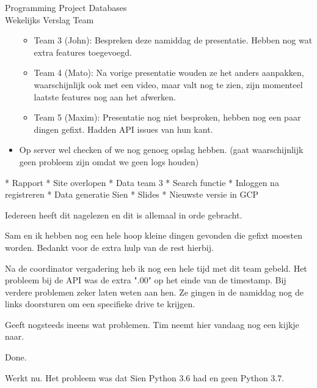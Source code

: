 \documentclass{article}
\newcounter{team}
\begin{document}
\begin{Minutes}{Programming Project Databases \\ Wekelijks Verslag Team }
\begin{itemize}
\begin{itemize}
                \item Team 3 (John): Bespreken deze namiddag de presentatie. Hebben nog wat extra features toegevoegd.
                \item Team 4 (Mato): Na vorige presentatie wouden ze het anders aanpakken, waarschijnlijk ook met een video, maar valt nog te zien, zijn momenteel laatste features nog aan het afwerken.
                \item Team 5 (Maxim): Presentatie nog niet besproken, hebben nog een paar dingen gefixt. Hadden API issues van hun kant.
            \end{itemize}
            \item Op server wel checken of we nog genoeg opslag hebben. (gaat waarschijnlijk geen probleem zijn omdat we geen logs houden)
        \end{itemize}


            \task[]* Rapport
            \task[]* Site overlopen
            \task[]* Data team 3
            \task[]* Search functie
            \task[]* Inloggen na registreren
            \task[]* Data generatie Sien
            \task[]* Slides
            \task[]* Nieuwste versie in GCP



            Iedereen heeft dit nagelezen en dit is allemaal in orde gebracht.

            Sam en ik hebben nog een hele hoop kleine dingen gevonden die gefixt moesten worden. Bedankt voor de extra hulp van de rest hierbij.

            Na de coordinator vergadering heb ik nog een hele tijd met dit team gebeld. Het probleem bij de API was de extra ".00" op het einde van  de timestamp. Bij verdere problemen zeker laten weten aan hen. Ze gingen in de namiddag nog de links doorsturen om een specifieke drive te krijgen.

            Geeft nogsteeds ineens wat problemen. Tim neemt hier vandaag nog een kijkje naar.

            Done.

            Werkt nu. Het probleem was dat Sien Python 3.6 had en geen Python 3.7.


\end{Minutes}
\end{document}
